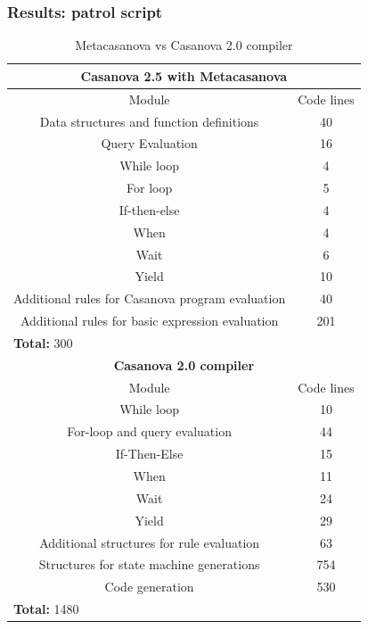 \documentclass[mathserif,serif]{beamer}
\begin{document}
\begin{frame}
	\frametitle{Results: patrol script}
	\begin{table}
		\centering
		\tiny	
		\begin{tabular}{|c|c|}
			\hline
			\multicolumn{2}{|c|}{\textbf{Casanova 2.5 with Metacasanova}} \\
			\hline
			Module & Code lines \\
			\hline
			Data structures and function definitions & 40 \\
			\hline
			Query Evaluation & 16 \\
			\hline
			While loop & 4 \\
			\hline
			For loop & 5 \\
			\hline
			If-then-else & 4 \\
			\hline
			When & 4 \\
			\hline
			Wait & 6 \\
			\hline
			Yield & 10 \\
			\hline
			Additional rules for Casanova program evaluation & 40 \\
			\hline
			Additional rules for basic expression evaluation & 201 \\
			\hline
			\multicolumn{2}{|l|}{\textbf{Total: } 300} \\
			\hline
			\multicolumn{2}{|c|}{\textbf{Casanova 2.0 compiler}} \\
			\hline
			Module & Code lines \\
			\hline
			While loop & 10 \\
			\hline
			For-loop and query evaluation & 44 \\
			\hline
			If-Then-Else & 15 \\
			\hline
			When & 11 \\
			\hline
			Wait & 24 \\
			\hline
			Yield & 29 \\
			\hline
			Additional structures for rule evaluation & 63 \\
			\hline
			Structures for state machine generations & 754 \\
			\hline
			Code generation & 530 \\
			\hline
			\multicolumn{2}{|l|}{\textbf{Total: } 1480} \\
			\hline			
		\end{tabular}
		\caption{Metacasanova vs Casanova 2.0 compiler}
		\label{tab:evaluation}
	\end{table}	
\end{frame}
\end{document}
